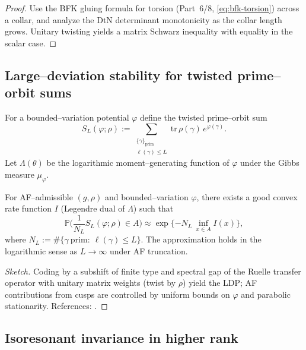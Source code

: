 \begin{proof}
Use the BFK gluing formula for torsion (Part~6/8, \eqref{eq:bfk-torsion}) across a collar, and analyze the DtN determinant monotonicity as the collar length grows. Unitary twisting yields a matrix Schwarz inequality with equality in the scalar case. %
\end{proof}

\subsection{Large–deviation stability for twisted prime–orbit sums}
\label{subsec:af-LD}
\relax\hspace{0pt}

For a bounded–variation potential $\varphi$ define the twisted prime–orbit sum
\[
S_L(\varphi;\rho):=\sum_{\substack{\{\gamma\}_{\mathrm{prim}}\\ \ell(\gamma)\le L}}
\mathrm{tr}\,\rho(\gamma)\, e^{\varphi(\gamma)}.
\]
Let $\Lambda(\theta)$ be the logarithmic moment–generating function of $\varphi$ under the Gibbs measure $\mu_\varphi$.

\begin{theorem}
\label{thm:LD}
For AF–admissible $(g,\rho)$ and bounded–variation $\varphi$, there exists a good convex rate function $I$ (Legendre dual of $\Lambda$) such that
\[
\mathbb{P}\Big(\frac{1}{N_L}S_L(\varphi;\rho)\in A\Big)
\approx \exp\{-N_L\,\inf_{x\in A} I(x)\},
\]
where $N_L:=\#\{\gamma\ \mathrm{prim}:\ \ell(\gamma)\le L\}$. The approximation holds in the logarithmic sense as $L\to\infty$ under AF truncation.
\end{theorem}

\begin{proof}[Sketch]
Coding by a subshift of finite type and spectral gap of the Ruelle transfer operator with unitary matrix weights (twist by $\rho$) yield the LDP; AF contributions from cusps are controlled by uniform bounds on $\varphi$ and parabolic stationarity. References: \cite{PPS,NaudLD,Borthwick}. %
\end{proof}

\subsection{Isoresonant invariance in higher rank}
\label{subsec:af-isores-hr}
\relax\hspace{0pt}

